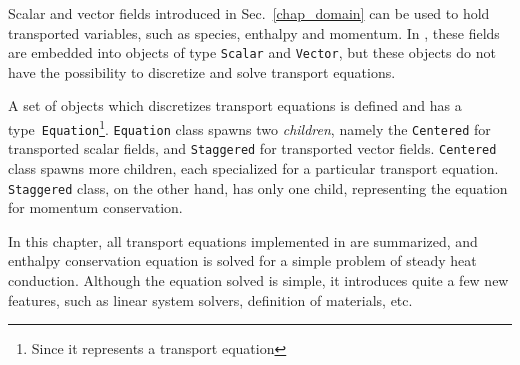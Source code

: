 \label{chap_transport}

Scalar and vector fields introduced in Sec.~\ref{chap_domain}
can be used to hold transported variables, such as species, enthalpy
and momentum. In {\psiboil}, these fields are embedded into objects
of type {\tt Scalar} and {\tt Vector}, but these objects do not 
have the possibility to discretize and solve transport equations. 

A set of objects which discretizes transport equations is defined
and has a type~{\tt Equation}\footnote{Since it represents a transport equation}.
{\tt Equation} class spawns two {\em children}, namely the {\tt Centered}
for transported scalar fields, and {\tt Staggered} for transported
vector fields. {\tt Centered} class spawns more children, each
specialized for a particular transport equation. {\tt Staggered} class, on the
other hand, has only one child, representing the equation for momentum 
conservation. 

In this chapter, all transport equations implemented in {\psiboil}
are summarized, and enthalpy conservation equation is solved for
a simple problem of steady heat conduction. Although the 
equation solved is simple, it introduces quite a few new
{\psiboil} features, such as linear system solvers, definition 
of materials, etc.
